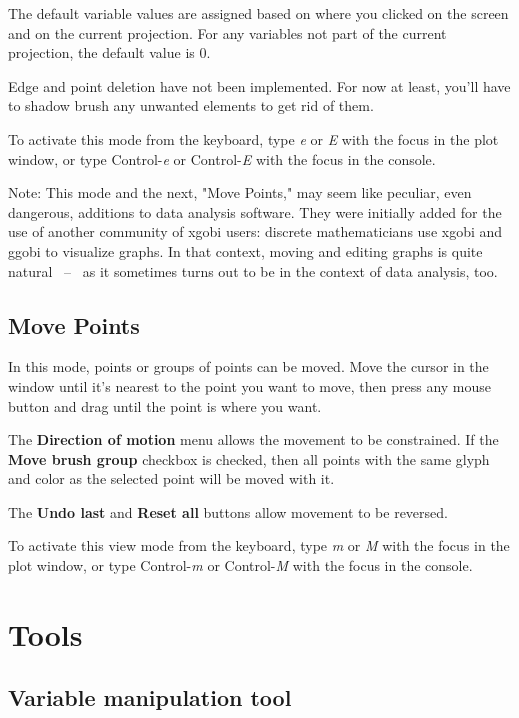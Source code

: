 \documentclass[11pt]{article}
\begin{document}
The default variable values are assigned based on where you clicked
on the screen and on the current projection.  For any variables not
part of the current projection, the default value is 0.

Edge and point deletion have not been implemented.  For now at
least, you'll have to shadow brush any unwanted elements to get
rid of them.

To activate this mode from the keyboard, type {\em e} or {\em E}
with the focus in the plot window, or type Control-{\em e} or
Control-{\em E} with the focus in the console.

Note: This mode and the next, "Move Points," may seem like peculiar,
even dangerous, additions to data analysis software.  They were
initially added for the use of another community of xgobi users:
discrete mathematicians use xgobi and ggobi to visualize graphs.  In
that context, moving and editing graphs is quite natural ~--~ as it
sometimes turns out to be in the context of data analysis, too.

\subsection{Move Points}
\label{slbl:MovePoints}

In this mode, points or groups of points can be moved.  Move
the cursor in the window until it's nearest to the point you
want to move, then press any mouse button and drag until the
point is where you want.

The {\bf Direction of motion} menu allows the movement to be
constrained.  If the {\bf Move brush group} checkbox is
checked, then all points with the same glyph and color as
the selected point will be moved with it.

The {\bf Undo last} and {\bf Reset all} buttons allow movement
to be reversed.

To activate this view mode from the keyboard, type {\em m} or {\em M}
with the focus in the plot window, or type Control-{\em m} or
Control-{\em M} with the focus in the console.

\newpage
\section{Tools}
\label{Tools}

\subsection{Variable manipulation tool}
\label{slbl:VarManip}
\end{document}
